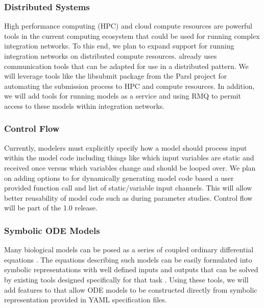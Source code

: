 \documentclass[journal]{IEEEtran}
\newcommand{\todo}[1]{{\color{red}{#1}}}
\newcommand{\pkg}{{\tt \todo{cis\_interface}}{}}
\begin{document}
\subsubsection{Distributed Systems}\label{SS:distributed}
%
High performance computing (HPC) and cloud compute resources are powerful 
tools in the current computing ecosystem that could be used for running 
complex integration networks. To this end, we plan to expand {\pkg} 
support for running integration networks on distributed compute resources. 
{\pkg} already uses communication tools that can be adapted for use 
in a distributed pattern. We will leverage tools like the libsubmit package from the 
Parsl project \citep{babuji18} for 
automating the submission process to HPC and compute resources. In addition, 
we will add tools for running models as a service and using RMQ to 
permit access to these models within integration networks.

\subsubsection{Control Flow}\label{SS:control}
%
Currently, modelers must explicitly specify how a model should process input 
within the model code including things like which input variables are static 
and received once versus which variables change and should be looped over. 
We plan on adding options to {\pkg} for dynamically generating model code 
based a user provided function call and list of static/variable input channels. 
This will allow better reusability of model code such as during parameter studies.
Control flow will be part of the {\pkg} 1.0 release.

\subsubsection{Symbolic ODE Models}\label{SS:ODE}
%
Many biological models can be posed as a series of coupled ordinary differential equations \citep[ODEs, ][]{WANG2015}. The equations describing such models can be easily formulated into symbolic representations \citep[e.g. SymPy][]{Meurer2017} with well defined inputs and outputs that can be solved by existing tools designed specifically for that task \citep[e.g. scipy.integrate.ode][]{Jones2001, Hairer1993}. Using these tools, we will add features to {\pkg} that allow ODE models to be constructed directly from symbolic representation provided in YAML specification files.

\end{document}
